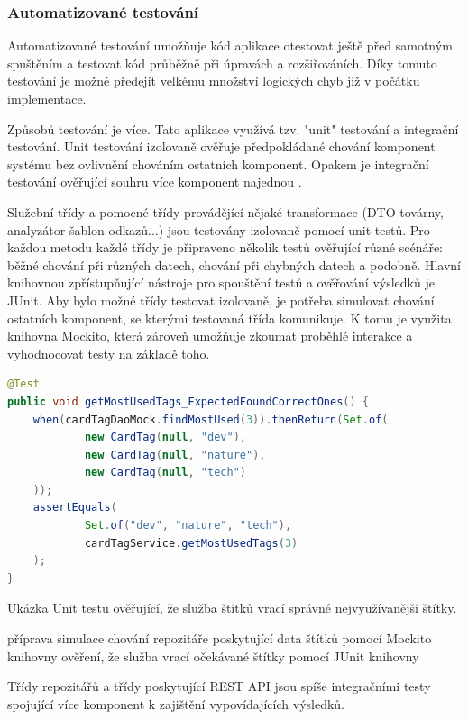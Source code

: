 		\subsubsection{Automatizované testování}

		Automatizované testování umožňuje kód aplikace otestovat ještě před samotným spuštěním a testovat
		kód průběžně při úpravách a rozšiřováních.
		Díky tomuto testování je možné předejít velkému množství logických chyb již v počátku implementace.

		Způsobů testování je více.
		Tato aplikace využívá tzv. "unit" testování a integrační testování.
		Unit testování izolovaně ověřuje předpokládané chování komponent systému bez ovlivnění chováním
		ostatních komponent\cite{unit_testing}.
		Opakem je integrační testování ověřující souhru více komponent najednou \cite{integration_testing}.

		Služební třídy a pomocné třídy provádějící nějaké transformace (\ac{DTO} továrny, analyzátor šablon odkazů...)
		jsou testovány izolovaně pomocí unit testů.
		Pro každou metodu každé třídy je připraveno několik testů ověřující různé scénáře: běžné chování při různých datech,
		chování při chybných datech a podobně.
		Hlavní knihovnou zpřístupňující nástroje pro spouštění testů a ověřování výsledků je JUnit.
		Aby bylo možné třídy testovat izolovaně, je potřeba simulovat chování ostatních komponent, se kterými testovaná
		třída komunikuje.
		K tomu je využita knihovna Mockito, která zároveň umožňuje zkoumat proběhlé interakce a vyhodnocovat testy
		na základě toho.

		\begin{lstlisting}[language=Java]
@Test
public void getMostUsedTags_ExpectedFoundCorrectOnes() {
	when(cardTagDaoMock.findMostUsed(3)).thenReturn(Set.of(
			new CardTag(null, "dev"),
			new CardTag(null, "nature"),
			new CardTag(null, "tech")
	));
	assertEquals(
			Set.of("dev", "nature", "tech"),
			cardTagService.getMostUsedTags(3)
	);
}
		\end{lstlisting}
		Ukázka Unit testu ověřující, že služba štítků vrací správné nejvyužívanější štítky. %

		příprava simulace chování repozitáře poskytující data štítků pomocí Mockito knihovny
		ověření, že služba vrací očekávané štítky pomocí JUnit knihovny

		Třídy repozitářů a třídy poskytující \ac{REST} \ac{API} jsou spíše integračními testy spojující více
		komponent k zajištění vypovídajících výsledků.

